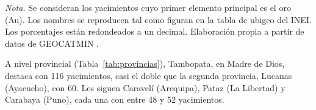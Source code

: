 \documentclass[man,12pt,a4paper,floatsintext,donotrepeattitle]{apa7}
\begin{document}
\begin{table}[htbp]
\begin{threeparttable}
\begin{tabular}{@{}llrr@{}}
\bottomrule
\end{tabular}
\vspace{6pt}
\begin{tablenotes}[flushleft]
\small
\item \textit{Nota.} Se consideran los yacimientos cuyo primer elemento
principal es el oro (Au). Los nombres se reproducen tal como figuran en la
tabla de ubigeo del INEI. Los porcentajes están redondeados a un decimal.
Elaboración propia a partir de datos de GEOCATMIN \parencite{ingemmet2026}.
\end{tablenotes}
\end{threeparttable}
\end{table}

A nivel provincial (Tabla~\ref{tab:provincias}), Tambopata, en Madre de Dios,
destaca con 116 yacimientos, casi el doble que la segunda provincia, Lucanas
(Ayacucho), con 60. Les siguen Caravelí (Arequipa), Pataz (La Libertad) y
Carabaya (Puno), cada una con entre 48 y 52 yacimientos.
\end{document}
